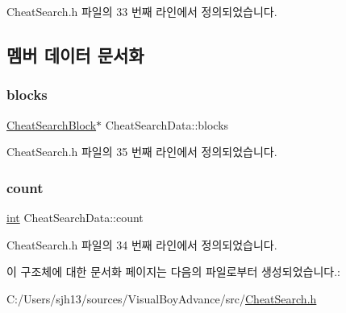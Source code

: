 Cheat\+Search.\+h 파일의 33 번째 라인에서 정의되었습니다.



\subsection{멤버 데이터 문서화}
\mbox{\label{struct_cheat_search_data_ae0235bdc2000cc25b8c072442ce33c2c}} 
\subsubsection{\texorpdfstring{blocks}{blocks}}
{\footnotesize\ttfamily \mbox{\hyperlink{struct_cheat_search_block}{Cheat\+Search\+Block}}$\ast$ Cheat\+Search\+Data\+::blocks}



Cheat\+Search.\+h 파일의 35 번째 라인에서 정의되었습니다.

\mbox{\label{struct_cheat_search_data_a4c4d3092ddaff068d820c28067b15774}} 
\subsubsection{\texorpdfstring{count}{count}}
{\footnotesize\ttfamily \mbox{\hyperlink{_util_8cpp_a0ef32aa8672df19503a49fab2d0c8071}{int}} Cheat\+Search\+Data\+::count}



Cheat\+Search.\+h 파일의 34 번째 라인에서 정의되었습니다.



이 구조체에 대한 문서화 페이지는 다음의 파일로부터 생성되었습니다.\+:\begin{DoxyCompactItemize}
\item 
C\+:/\+Users/sjh13/sources/\+Visual\+Boy\+Advance/src/\mbox{\hyperlink{_cheat_search_8h}{Cheat\+Search.\+h}}\end{DoxyCompactItemize}
